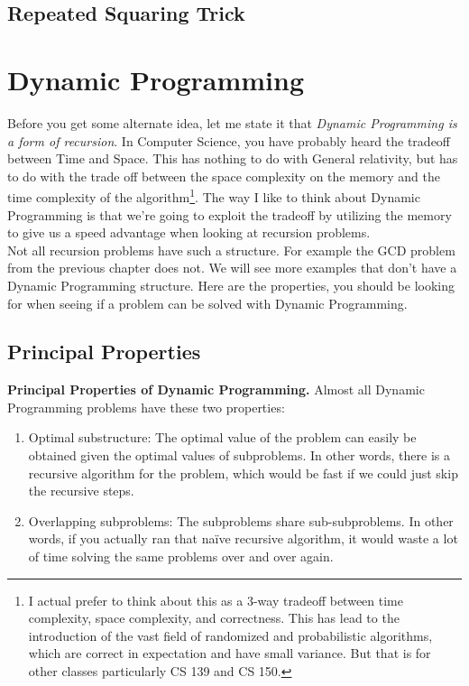 \documentclass[10pt]{article}
\theoremstyle{plain}
\theoremstyle{definition}
\numberwithin{equation}{section}
\numberwithin{figure}{section}
\begin{document}
\subsection{Repeated Squaring Trick}

\newpage
\section{Dynamic Programming}

Before you get some alternate idea, let me state it that \emph{Dynamic Programming is a form of recursion}. In Computer Science, you have probably heard the tradeoff between Time and Space. This has nothing to do with General relativity, but has to do with the trade off between the space complexity on the memory and the time complexity of the algorithm\footnote{I actual prefer to think about this as a 3-way tradeoff between time complexity, space complexity, and correctness. This has lead to the introduction of the vast field of randomized and probabilistic algorithms, which are correct in expectation and have small variance. But that is for other classes particularly CS 139 and CS 150.}. The way I like to think about Dynamic Programming is that we're going to exploit the tradeoff by utilizing the memory to give us a speed advantage when looking at recursion problems. \\

\noindent Not all recursion problems have such a structure. For example the GCD problem from the previous chapter does not. We will see more examples that don't have a Dynamic Programming structure. Here are the properties, you should be looking for when seeing if a problem can be solved with Dynamic Programming.

\subsection{Principal Properties}

\begin{framed}
\noindent \textbf{Principal Properties of Dynamic Programming.} Almost all Dynamic Programming problems have these two properties:
\begin{enumerate}
\item Optimal substructure: The optimal value of the problem can easily be obtained given the optimal values of subproblems. In other words, there is a recursive algorithm for the problem, which would be fast if we could just skip the recursive steps.
\item Overlapping subproblems: The subproblems share sub-subproblems. In other words, if you actually ran that na{\"i}ve recursive algorithm, it would waste a lot of time solving the same problems over and over again.
\end{enumerate}
\end{framed}
\end{document}
